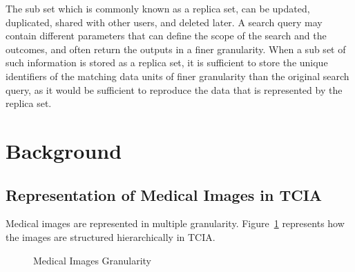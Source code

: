 \documentclass[conference]{IEEEtran}
\begin{document}
The sub set which is commonly known as a replica set, can be updated, duplicated, shared with other users, and deleted later. A search query may contain different parameters that can define the scope of the search and the outcomes, and often return the outputs in a finer granularity. When a sub set of such information is stored as a replica set, it is sufficient to store the unique identifiers of the matching data units of finer granularity than the original search query, as it would be sufficient to reproduce the data that is represented by the replica set.

\section{Background}
\balance
\subsection{Representation of Medical Images in TCIA}
Medical images are represented in multiple granularity. Figure~\ref{fig:granularity} represents how the images are structured hierarchically in TCIA.
\begin{figure}[b]
\begin{center}
\end{center}
 \caption{Medical Images Granularity}
 \label{fig:granularity}
\end{figure}
\end{document}
